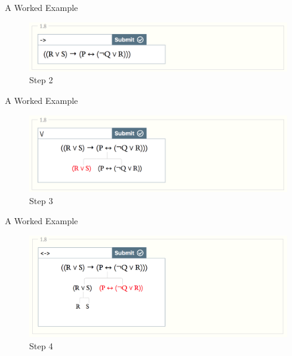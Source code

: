 \documentclass[
  ignorenonframetext,
]{beamer}
\renewcommand{\,}{\text{, }}
\begin{document}
\begin{frame}{A Worked Example}
\protect\hypertarget{a-worked-example-1}{}

\begin{figure}
\centering
\includegraphics{../images/class02/2.png}
\caption{Step 2}
\end{figure}

\end{frame}

\begin{frame}{A Worked Example}
\protect\hypertarget{a-worked-example-2}{}

\begin{figure}
\centering
\includegraphics{../images/class02/3.png}
\caption{Step 3}
\end{figure}

\end{frame}

\begin{frame}{A Worked Example}
\protect\hypertarget{a-worked-example-3}{}

\begin{figure}
\centering
\includegraphics{../images/class02/4.png}
\caption{Step 4}
\end{figure}

\end{frame}
\end{document}
